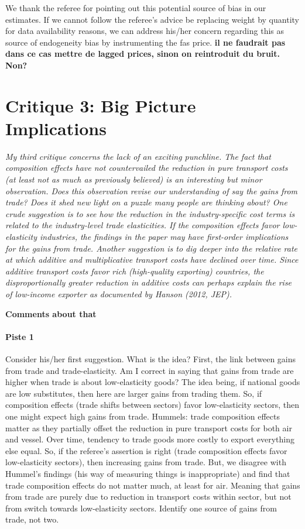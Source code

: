 \documentclass[a4paper,12pt]{article}
\begin{document}
We thank the referee for pointing out this potential source of bias in our estimates. If we cannot follow the referee's advice be replacing weight by quantity for data availability reasons, we can address his/her concern regarding this as source of endogeneity bias by instrumenting the fas price. \textbf{il ne faudrait pas dans ce cas mettre de lagged prices, sinon on reintroduit du bruit. Non?}

\section{Critique 3: Big Picture Implications}

\textit{My third critique concerns the lack of an exciting punchline. The fact that
composition effects have not countervailed the reduction in pure transport costs
(at least not as much as previously believed) is an interesting but minor observation.
Does this observation revise our understanding of say the gains from
trade? Does it shed new light on a puzzle many people are thinking about?
One crude suggestion is to see how the reduction in the industry-specific cost
terms is related to the industry-level trade elasticities. If the composition effects
favor low-elasticity industries, the findings in the paper may have first-order
implications for the gains from trade.
Another suggestion is to dig deeper into the relative rate at which additive
and multiplicative transport costs have declined over time. Since additive transport
costs favor rich (high-quality exporting) countries, the disproportionally
greater reduction in additive costs can perhaps explain the rise of low-income
exporter as documented by Hanson (2012, JEP).}


\textbf{Comments about that}

\paragraph{Piste 1} Consider his/her first suggestion. What is the idea? First, the link between gains from trade and trade-elasticity. Am I correct in saying that gains from trade are higher when trade is about low-elasticity goods? The idea being, if national goods are low substitutes, then here are larger gains from trading them. So, if composition effects (trade shifts between sectors) favor low-elasticity sectors, then one might expect high gains from trade. Hummels: trade composition effects matter as they partially offset the reduction in pure transport costs for both air and vessel. Over time, tendency to trade goods more costly to export everything else equal. So, if the referee's assertion is right (trade composition effects favor low-elasticity sectors), then increasing gains from trade. But, we disagree with Hummel's findings (his way of measuring things is inappropriate) and find that trade composition effects do not matter much, at least for air. Meaning that gains from trade are purely due to reduction in transport costs within sector, but not from switch towards low-elasticity sectors. Identify one source of gains from trade, not two.
\end{document}
